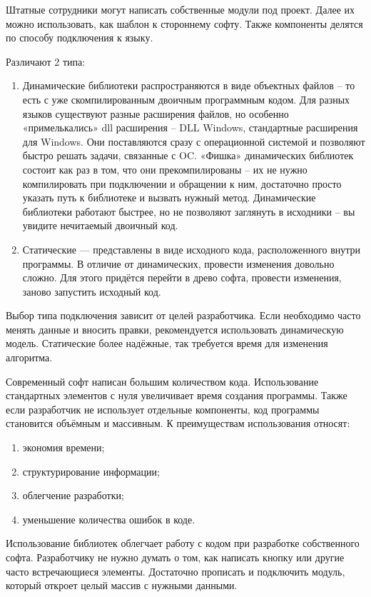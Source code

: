 Штатные сотрудники могут написать собственные модули под проект. Далее их можно использовать, как шаблон к стороннему софту. Также компоненты делятся по способу подключения к языку.
\begin{utv}
  Различают 2 типа:
  \begin{enumerate}
    \item Динамические библиотеки распространяются в виде объектных файлов – то есть с уже скомпилированным двоичным программным кодом. Для разных языков существуют разные расширения файлов, но особенно «примелькались» dll расширения – DLL Windows, стандартные расширения для Windows. Они поставляются сразу с операционной системой и позволяют быстро решать задачи, связанные с OC. «Фишка» динамических библиотек состоит как раз в том, что они прекомпилированы – их не нужно компилировать при подключении и обращении к ним, достаточно просто указать путь к библиотеке и вызвать нужный метод. Динамические библиотеки работают быстрее, но не позволяют заглянуть в исходники – вы увидите нечитаемый двоичный код.
    \item Статические — представлены в виде исходного кода, расположенного внутри программы. В отличие от динамических, провести изменения довольно сложно. Для этого придётся перейти в древо софта, провести изменения, заново запустить исходный код.
  \end{enumerate}
\end{utv}


Выбор типа подключения зависит от целей разработчика. Если необходимо часто менять данные и вносить правки, рекомендуется использовать динамическую модель. Статические более надёжные, так требуется время для изменения алгоритма.

Современный софт написан большим количеством кода. Использование стандартных элементов с нуля увеличивает время создания программы. Также если разработчик не использует отдельные компоненты, код программы становится объёмным и массивным. К преимуществам использования относят:

\begin{enumerate}
  \item экономия времени;
  \item структурирование информации;
  \item облегчение разработки;
  \item уменьшение количества ошибок в коде.
\end{enumerate}

Использование библиотек облегчает работу с кодом при разработке собственного софта. Разработчику не нужно думать о том, как написать кнопку или другие часто встречающиеся элементы. Достаточно прописать и подключить модуль, который откроет целый массив с нужными данными.

